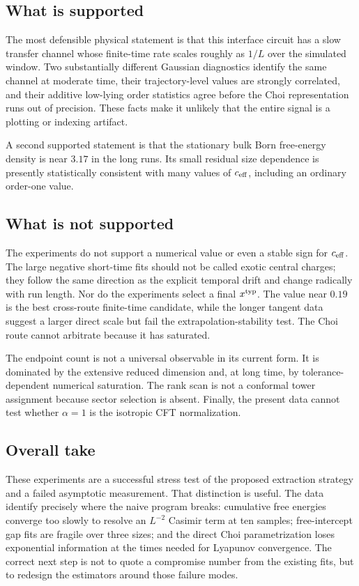 \documentclass[aps,prb,onecolumn,nofootinbib,superscriptaddress]{revtex4-2}
\begin{document}
\subsection{What is supported}

The most defensible physical statement is that this interface circuit has a slow transfer
channel whose finite-time rate scales roughly as $1/L$ over the simulated window.  Two
substantially different Gaussian diagnostics identify the same channel at moderate time,
their trajectory-level values are strongly correlated, and their additive low-lying order
statistics agree before the Choi representation runs out of precision.  These facts make it
unlikely that the entire signal is a plotting or indexing artifact.

A second supported statement is that the stationary bulk Born free-energy density is near
$3.17$ in the long runs.  Its small residual size dependence is presently statistically
consistent with many values of $c_{\rm eff}$, including an ordinary order-one value.

\subsection{What is not supported}

The experiments do not support a numerical value or even a stable sign for
$c_{\rm eff}$.  The large negative short-time fits should not be called exotic central
charges; they follow the same direction as the explicit temporal drift and change radically
with run length.  Nor do the experiments select a final $x^{\rm typ}$.  The value near
$0.19$ is the best cross-route finite-time candidate, while the longer tangent data suggest
a larger direct scale but fail the extrapolation-stability test.  The Choi route cannot
arbitrate because it has saturated.

The endpoint count is not a universal observable in its current form.  It is dominated by
the extensive reduced dimension and, at long time, by tolerance-dependent numerical
saturation.  The rank scan is not a conformal tower assignment because sector selection is
absent.  Finally, the present data cannot test whether $\alpha=1$ is the isotropic CFT
normalization.

\subsection{Overall take}

These experiments are a successful stress test of the proposed extraction strategy and a
failed asymptotic measurement.  That distinction is useful.  The data identify precisely
where the naive program breaks: cumulative free energies converge too slowly to resolve an
$L^{-2}$ Casimir term at ten samples; free-intercept gap fits are fragile over three sizes;
and the direct Choi parametrization loses exponential information at the times needed for
Lyapunov convergence.  The correct next step is not to quote a compromise number from the
existing fits, but to redesign the estimators around those failure modes.
\end{document}
